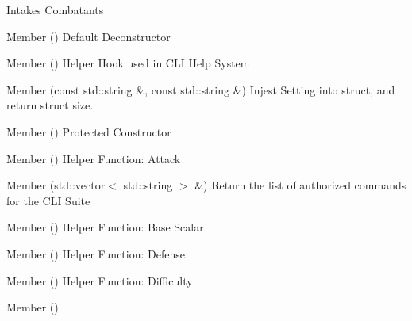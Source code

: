\begin{DoxyRefList}
%
Intakes Combatants  
\item[Member \doxylink{class_combat_a044df77ec24b76ca8b1cc3dde0de5049}{Combat\+::\texorpdfstring{$\sim$}{\string~}\+Combat} ()]\label{todo__todo000084}%
%
Default Deconstructor  
\item[Member \doxylink{class_config_manager_a7835eee23acb1765a5fb10d2c2b2df0b}{Config\+Manager\+::\+\_\+help} ()]\label{todo__todo000101}%
%
Helper Hook used in CLI Help System  
\item[Member \doxylink{class_config_manager_a20f7cccf9a79f3c95a493660d4ba5919}{Config\+Manager\+::add\+\_\+setting} (const std\+::string \&, const std\+::string \&)]\label{todo__todo000089}%
%
Injest Setting into struct, and return struct size.  
\item[Member \doxylink{class_config_manager_a7d3d7c10423d969f7544509f6fcca32f}{Config\+Manager\+::Config\+Manager} ()]\label{todo__todo000085}%
%
Protected Constructor  
\item[Member \doxylink{class_config_manager_a328ee1b9545e093db2f7569a4022b476}{Config\+Manager\+::get\+\_\+attack} ()]\label{todo__todo000093}%
%
Helper Function\+: Attack  
\item[Member \doxylink{class_config_manager_ae3382cfdaf7e3821de61c118303ff778}{Config\+Manager\+::get\+\_\+authorized\+Commands} (std\+::vector$<$ std\+::string $>$ \&)]\label{todo__todo000092}%
%
Return the list of authorized commands for the CLI Suite  
\item[Member \doxylink{class_config_manager_a57b0095138267495fa6da6c2147bf70e}{Config\+Manager\+::get\+\_\+base} ()]\label{todo__todo000094}%
%
Helper Function\+: Base Scalar  
\item[Member \doxylink{class_config_manager_a7da8012593610ab3558103a5f8e0a3cb}{Config\+Manager\+::get\+\_\+defense} ()]\label{todo__todo000095}%
%
Helper Function\+: Defense  
\item[Member \doxylink{class_config_manager_a93ea2b6222eb97fd706db88f36e3d237}{Config\+Manager\+::get\+\_\+difficulty} ()]\label{todo__todo000096}%
%
Helper Function\+: Difficulty  
\item[Member \doxylink{class_config_manager_a49bae2cd26a9003f5610a99880fb6422}{Config\+Manager\+::get\+\_\+flux} ()]\label{todo__todo000097}%

\end{DoxyRefList}
